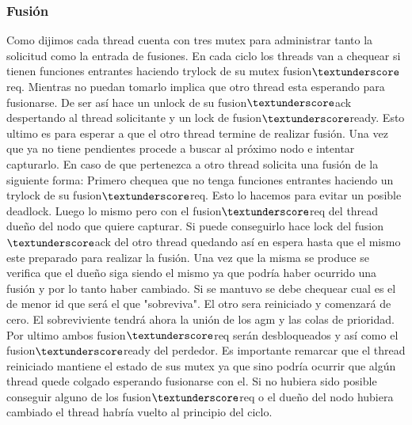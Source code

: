 \subsubsection{Fusión}

Como dijimos cada thread cuenta con tres mutex para administrar tanto la solicitud como la entrada de fusiones. En cada ciclo los threads van a chequear si tienen funciones entrantes haciendo trylock de su mutex fusion$\textunderscore$req. Mientras no puedan tomarlo implica que otro thread esta esperando para fusionarse. De ser así hace un unlock de su fusion$\textunderscore$ack despertando al thread solicitante y un lock de fusion$\textunderscore$ready. Esto ultimo es para esperar a que el otro thread termine de realizar fusión. Una vez que ya no tiene pendientes procede a buscar al próximo nodo e intentar capturarlo. En caso de que pertenezca a otro thread solicita una fusión de la siguiente forma: Primero chequea que no tenga funciones entrantes haciendo un trylock de su fusion$\textunderscore$req. Esto lo hacemos para evitar un posible deadlock. Luego lo mismo pero con el fusion$\textunderscore$req del thread dueño del nodo que quiere capturar. Si puede conseguirlo hace lock del fusion$\textunderscore$ack del otro thread quedando así en espera hasta que el mismo este preparado para realizar la fusión. Una vez que la misma se produce se verifica que el dueño siga siendo el mismo ya que podría haber ocurrido una fusión y por lo tanto haber cambiado. Si se mantuvo se debe chequear cual es el de menor id que será el que "sobreviva". El otro sera reiniciado y comenzará de cero. El sobreviviente tendrá ahora la unión de los agm y las colas de prioridad. Por ultimo ambos fusion$\textunderscore$req serán desbloqueados y así como el fusion$\textunderscore$ready del perdedor. Es importante remarcar que el thread reiniciado mantiene el estado de sus mutex ya que sino podría ocurrir que algún thread quede colgado esperando fusionarse con el. Si no hubiera sido posible conseguir alguno de los fusion$\textunderscore$req o el dueño del nodo hubiera cambiado el thread habría vuelto al principio del ciclo.

